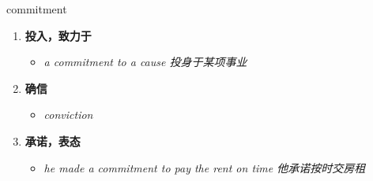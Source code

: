 
\begin{frame}
{\huge commitment}
\begin{center}
\begin{enumerate}\Large
  \item \textbf{投入，致力于}
  \begin{itemize}
    \item \em{\Large{a commitment to a cause 投身于某项事业}}
  \end{itemize}
  \item \textbf{确信}
  \begin{itemize}
    \item \em{\Large{conviction}}
  \end{itemize}
  \item \textbf{承诺，表态}
  \begin{itemize}
    \item \em{\Large{he made a commitment to pay the rent on time 他承诺按时交房租}}
  \end{itemize}
\end{enumerate}
\end{center}
\end{frame}
